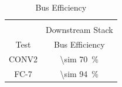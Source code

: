 \documentclass[journal]{IEEEtran}
\begin{document}
\begin{table}[h]
\begin{subtable}{0.5\textwidth}
  \end{subtable}
  \bigskip
  \begin{subtable}{0.5\textwidth}
    \centering
    \begin{adjustbox}{width=0.7\textwidth}
      \begin{tabular}{cc}
        \toprule
                                                      &                                          \\  %
                                                      & Downstream Stack                         \\  %
                   Test \cite{krizhevsky2012imagenet} & Bus Efficiency                           \\  %
        \hline  %
                   CONV2                              &\SI[per-mode=symbol]{\sim 70}{\percent}   \\ %
                   FC-7                               &\SI[per-mode=symbol]{\sim 94}{\percent}   \\ %
        \bottomrule
      \end{tabular}
    \end{adjustbox}
    \vspace{3pt}
    \captionsetup{justification=centering, skip=10pt}
    \caption{Bus Efficiency}
    \label{tab:Bus Efficiency}
  \end{subtable}
  \end{table}
\end{document}
